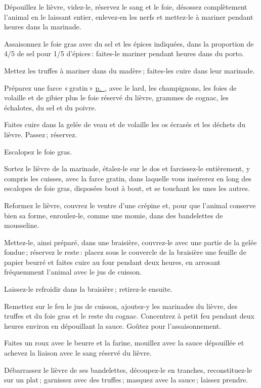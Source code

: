 Dépouillez le lièvre, videz-le, réservez le sang et le foie, désossez
complètement l'animal en le laissant entier, enlevez-en les nerfs et mettez-le
à mariner pendant {\mmm} heures dans la marinade.

Assaisonnez le foie gras avec du sel et les épices indiquées, dans la
proportion de 4/5 de sel pour 1/5 d'épices : faites-le mariner pendant
{\mmm} heures dans du porto.

Mettez les truffes à mariner dans du madère ; faites-les cuire dans leur
marinade.

Préparez une farce « gratin » \hyperlink{p0613}{p. \pageref{pg0613}}, avec le
lard, les champignons, les foies de volaille et de gibier plus le foie réservé
du lièvre, {\mmm} grammes de cognac, les échalotes, du sel et du poivre.

Faites cuire dans la gelée de veau et de volaille les os écrasés et les déchets
du lièvre. Passez ; réservez.

Escalopez le foie gras.

Sortez le lièvre de la marinade, étalez-le sur le dos et farcissez-le
entièrement, y compris les cuisses, avec la farce gratin, dans laquelle vous
insérerez en long des escalopes de foie gras, disposées bout à bout, et se
touchant les unes les autres.

Reformez le lièvre, couvrez le ventre d'une crépine et, pour que l'animal
conserve bien sa forme, enroulez-le, comme une momie, dans des bandelettes de
mousseline.

Mettez-le, ainsi préparé, dans une braisière, couvrez-le avec une partie de la
gelée fondue ; réservez le reste : placez sous le couvercle de la braisière une
feuille de papier beurré et faites cuire au four pendant deux heures, en
arrosant fréquemment l'animal avec le jus de cuisson.

Laissez-le refroidir dans la braisière ; retirez-le ensuite.

Remettez sur le feu le jus de cuisson, ajoutez-y les marinades du lièvre, des
truffes et du foie gras et le reste du cognac. Concentrez à petit feu pendant
deux heures environ en dépouillant la sauce. Goûtez pour l'assaisonnement.

Faites un roux avec le beurre et la farine, mouillez avec la sauce dépouillée
et achevez la liaison avec le sang réservé du lièvre.

Débarrassez le lièvre de ses bandelettes, découpez-le en tranches,
reconstituez-le sur un plat ; garnissez avec des truffes ; masquez avec la
sauce ; laissez prendre.

